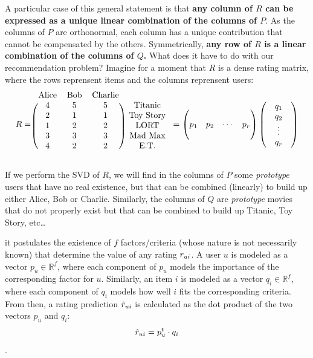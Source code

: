 A particular case of this general statement is that \textbf{any column of $R$
can be expressed as a unique linear combination of the columns of $P$}. As the
columns of $P$ are orthonormal, each column has a unique contribution that
cannot be compensated by the others. Symmetrically, \textbf{any row of $R$ is a
linear combination of the columns of $Q$.} What does it have to do with our
recommendation problem? Imagine for a moment that $R$ is a dense rating matrix,
where the rows reprensent items and the columns reprensent users:
$$
R = \begin{blockarray}{cccc}
  \text{Alice} & \text{Bob} & \text{Charlie} \\
\begin{block}{(ccc) c}
  4 & 5 & 5 & \text{Titanic} \\
  2 & 1 & 1 & \text{Toy Story} \\
  1 & 2 & 2 & \text{LORT} \\
  3 & 3 & 3 & \text{Mad Max} \\
  4 & 2 & 2 & \text{E.T.} \\
\end{block}
\end{blockarray}
=
\begin{pmatrix}
  \\
  p_1& p_2 & \cdots & p_r\\
  \\
\end{pmatrix}
\begin{pmatrix}
  & q_1 & \\
  & q_2 & \\
  & \vdots & \\
  & q_r & \\
\end{pmatrix}
$$




If we perform the SVD of $R$, we will find in the columns of $P$ some
\textit{prototype} users that have no real existence, but that can be combined
(linearly) to build up either Alice, Bob or Charlie. Similarly, the columns of
$Q$ are \textit{prototype} movies that do not properly exist but that can be
combined to build up Titanic, Toy Story, etc\dots

it postulates the existence of $f$
factors/criteria
(whose nature is not necessarily known) that determine the value of any rating
$r_{ui}$.  A user $u$ is modeled as a vector $p_u \in \mathbb{R}^f$, where each
component of $p_u$ models the importance of the corresponding factor for $u$.
Similarly, an item $i$ is modeled as a vector $q_i \in \mathbb{R}^f$, where
each component of $q_i$ models how well $i$ fits the corresponding criteria.
From then, a rating prediction $\hat{r}_{ui}$ is calculated as the dot product
of the two vectors $p_u$ and $q_i$: $$\hat{r}_{ui} = p_u^t \cdot q_i$$. 

